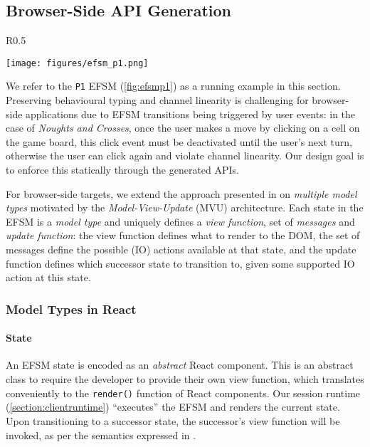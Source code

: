 \subsection{Browser-Side API Generation}

\label{section:browser}

\begin{wrapfigure}{R}{0.5\textwidth}
  \begin{center}
    \texttt{[image: figures/efsm\_p1.png]}
  \end{center}

  \label{fig:efsmp1}
\end{wrapfigure}

We refer to the \texttt{P1} EFSM (\cref{fig:efsmp1}) as a running example in
this section.
Preserving behavioural typing and channel linearity is challenging
for browser-side applications due to EFSM transitions being triggered by user
events:
in the case of \textit{Noughts and Crosses}, once the user makes a move by
clicking on a cell on the game board, this click event must be deactivated
until the user's next turn, otherwise the user can click again and violate
channel linearity.
Our design goal is to enforce this statically through the generated APIs.

For browser-side targets, we extend the approach presented in \cite{MVU2019} on
\textit{multiple model types} motivated by the \textit{Model-View-Update} (MVU)
architecture.
Each state in the EFSM is a \emph{model type} and uniquely defines a
\textit{view function}, set of \textit{messages} and \textit{update function}:
the view function defines what to render to the DOM, the set of messages define
the possible (IO) actions available at that state, and the update function
defines which successor state to transition to, given some supported IO action
at this state.

\subsubsection{Model Types in React}

\paragraph{State}
An EFSM state is encoded as an \textit{abstract} React
component.
This is an abstract class to require the developer to provide their
own view function, which translates conveniently to the \texttt{render()}
function of React components.
Our session runtime (\cref{section:clientruntime}) ``executes'' the EFSM and
renders the current state.
Upon transitioning to a successor state, the successor's view function will be
invoked, as per the semantics expressed in \cite{MVU2019}.

